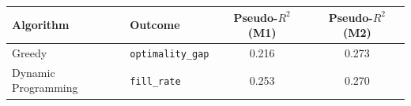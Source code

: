 \begin{tabular}{llcc}
\toprule
\textbf{Algorithm} & \textbf{Outcome} & \textbf{Pseudo-$R^2$ (M1)} & \textbf{Pseudo-$R^2$ (M2)} \\
\midrule
Greedy & \texttt{optimality\_gap} & 0.216 & 0.273 \\
Dynamic Programming & \texttt{fill\_rate} & 0.253 & 0.270 \\
\bottomrule
\end{tabular}

